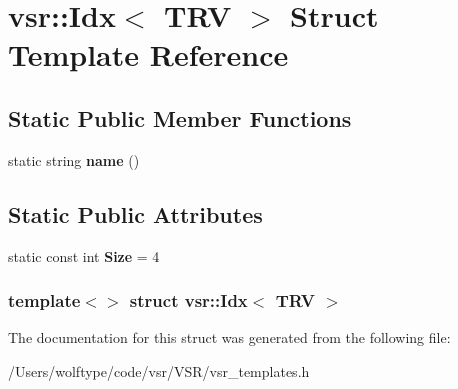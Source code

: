 \hypertarget{structvsr_1_1_idx_3_01_t_r_v_01_4}{\section{vsr\-:\-:Idx$<$ T\-R\-V $>$ Struct Template Reference}
\label{structvsr_1_1_idx_3_01_t_r_v_01_4}
}
\subsection*{Static Public Member Functions}
\begin{DoxyCompactItemize}
\item 
\hypertarget{structvsr_1_1_idx_3_01_t_r_v_01_4_aac05ea66eeaf1e9173f42e47fa20d3a7}{static string {\bfseries name} ()}\label{structvsr_1_1_idx_3_01_t_r_v_01_4_aac05ea66eeaf1e9173f42e47fa20d3a7}

\end{DoxyCompactItemize}
\subsection*{Static Public Attributes}
\begin{DoxyCompactItemize}
\item 
\hypertarget{structvsr_1_1_idx_3_01_t_r_v_01_4_ab9fdd8a517c02b55e4a9673288eb6750}{static const int {\bfseries Size} = 4}\label{structvsr_1_1_idx_3_01_t_r_v_01_4_ab9fdd8a517c02b55e4a9673288eb6750}

\end{DoxyCompactItemize}
\subsubsection*{template$<$$>$ struct vsr\-::\-Idx$<$ T\-R\-V $>$}



The documentation for this struct was generated from the following file\-:\begin{DoxyCompactItemize}
\item 
/\-Users/wolftype/code/vsr/\-V\-S\-R/vsr\-\_\-templates.\-h\end{DoxyCompactItemize}
